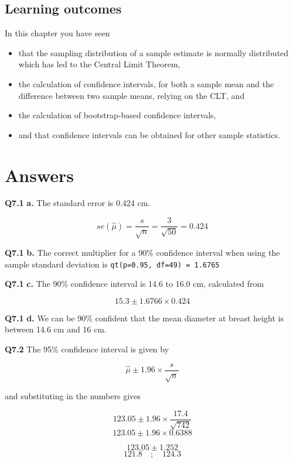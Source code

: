 \documentclass[
  oneside]{krantz}
\providecommand{\tightlist}{%
  \setlength{\itemsep}{0pt}\setlength{\parskip}{0pt}}
\begin{document}
\hypertarget{learning-outcomes-3}{%
\subsection{Learning outcomes}\label{learning-outcomes-3}}

In this chapter you have seen

\begin{itemize}
\tightlist
\item
  that the sampling distribution of a sample estimate is normally distributed which has led to the Central Limit Theorem,
\item
  the calculation of confidence intervals, for both a sample mean and the difference between two sample means, relying on the CLT, and
\item
  the calculation of bootstrap-based confidence intervals,
\item
  and that confidence intervals can be obtained for other sample statistics.
\end{itemize}

\hypertarget{ANSci}{%
\section{Answers}\label{ANSci}}

\textbf{Q7.1} \textbf{a.} The standard error is 0.424 cm.

\[se(\hat \mu) = \frac{s}{\sqrt{n}} = \frac{3}{\sqrt{50}} = 0.424\]

\textbf{Q7.1} \textbf{b.} The correct multiplier for a 90\% confidence interval when using the sample standard deviation is \texttt{qt(p=0.95,\ df=49)\ =\ 1.6765}

\textbf{Q7.1} \textbf{c.} The 90\% confidence interval is 14.6 to 16.0 cm, calculated from

\[15.3 \pm 1.6766 \times 0.424\]

\textbf{Q7.1} \textbf{d.} We can be 90\% confident that the mean diameter at breast height is between 14.6 cm and 16 cm.

\textbf{Q7.2} The 95\% confidence interval is given by

\[\hat \mu \pm 1.96 \times \frac{s}{\sqrt{n}}\]

and substituting in the numbers gives

\[123.05 \pm 1.96 \times \frac{17.4}{\sqrt{742}}\]
\[123.05 \pm 1.96 \times 0.6388\]

\[123.05 \pm 1.252 \]
\[121.8 \quad ; \quad 124.3\]
\end{document}
